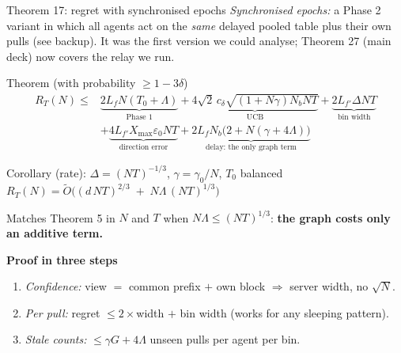 \documentclass[11pt]{beamer}
\begin{document}
\begin{frame}{Theorem 17: regret with synchronised epochs}
\scriptsize
\emph{Synchronised epochs:} a Phase 2 variant in which all agents act on the \emph{same} delayed pooled table plus their own pulls (see backup). It was the first version we could analyse; Theorem 27 (main deck) now covers the relay we run.\vspace{-0.3em}
\begin{block}{Theorem (with probability $\ge1-3\delta$)}
\vspace{-0.8em}
\begin{align*}
R_T(N)\le{}&\underbrace{2L_fN(T_0{+}\Lambda)}_{\text{Phase 1}}
+\underbrace{4\sqrt2\,c_\delta\sqrt{(1{+}N\gamma)N_bNT}}_{\text{UCB}}
+\underbrace{2L_{f'}\Delta NT}_{\text{bin width}}\\[-0.3em]
&+\underbrace{4L_{f'}X_{\max}\varepsilon_0 NT}_{\text{direction error}}
+\underbrace{2L_fN_b\big(2{+}N(\gamma{+}4\Lambda)\big)}_{\text{delay: the only graph term}}
\end{align*}
\end{block}
\begin{block}{Corollary (rate): $\Delta=(NT)^{-1/3}$, $\gamma=\gamma_0/N$, $T_0$ balanced}
\centering $R_T(N)=\tilde O\Big((d\,NT)^{2/3}\;+\;N\Lambda\,(NT)^{1/3}\Big)$\\[0.2em]
\raggedright
Matches Theorem 5 in $N$ and $T$ when $N\Lambda\le(NT)^{1/3}$: \textbf{the graph costs only an additive term.}
\end{block}
\vspace{-0.3em}\textbf{Proof in three steps}
\scriptsize
\begin{enumerate}\setlength{\itemsep}{0pt}
\item \emph{Confidence:} view $=$ common prefix $+$ own block $\Rightarrow$ server width, no $\sqrt N$.
\item \emph{Per pull:} regret $\le 2\times$width $+$ bin width (works for any sleeping pattern).
\item \emph{Stale counts:} $\le\gamma G+4\Lambda$ unseen pulls per agent per bin.
\end{enumerate}
\end{frame}
\end{document}
